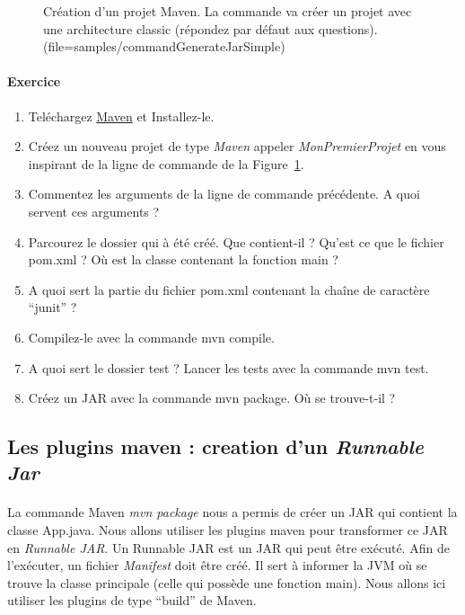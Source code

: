 \documentclass[a4,12pt]{article}
\begin{document}
 \begin{figure}[!ht]

\caption{Création d'un projet Maven. La commande va créer un projet avec une architecture classic (répondez par défaut aux questions). (file=samples/commandGenerateJarSimple) }\label{newMavenProject}
\end{figure}


\paragraph{Exercice}
\begin{enumerate}
	\item Teléchargez \href{http://maven.apache.org/download.html}{Maven}  et Installez-le.
	\item Créez un nouveau projet de type \emph{Maven} appeler \emph{MonPremierProjet} en vous inspirant de la ligne de commande de la Figure~\ref{newMavenProject}.
	\item Commentez les arguments de la ligne de commande précédente.  A quoi servent ces arguments ?
	\item Parcourez le dossier qui à été créé. Que contient-il ? Qu'est ce que le fichier pom.xml ? Où est la classe contenant la fonction main ?
	\item A quoi sert la partie du fichier pom.xml contenant la chaîne de caractère ``junit'' ?
	\item Compilez-le avec la commande mvn compile.
	\item A quoi sert le dossier test ? Lancer les tests avec la commande mvn test.
	\item Créez un JAR avec la commande mvn package. Où se trouve-t-il ?
\end{enumerate}


\subsection{Les plugins maven : creation d'un \emph{Runnable Jar}}

\paragraph{}
La commande Maven \emph{mvn package} nous a permis de créer un JAR qui contient la classe App.java. Nous allons utiliser les plugins maven pour transformer ce JAR en \emph{Runnable JAR}. Un Runnable JAR est un JAR qui peut être exécuté. Afin de l'exécuter, un fichier \emph{Manifest} doit être créé. Il sert à informer la JVM où se trouve la classe principale (celle qui possède une fonction main). Nous allons ici utiliser les plugins de type ``build'' de Maven. 
\end{document}

